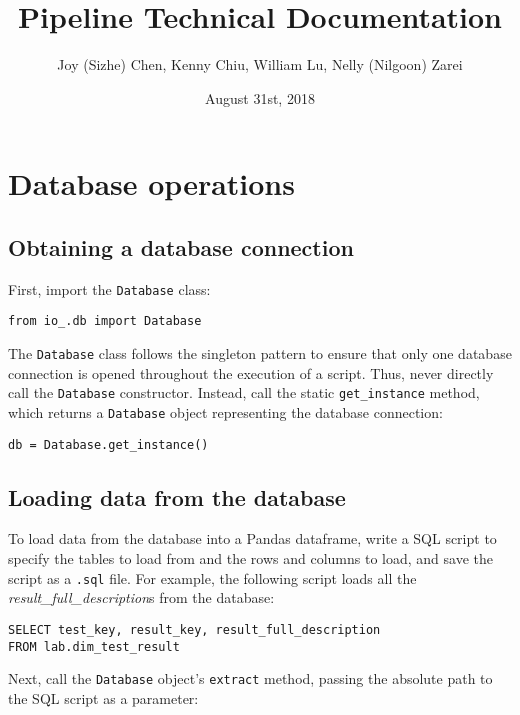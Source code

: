 \documentclass[a4paper]{article}
\title{Pipeline Technical Documentation}
\author{Joy (Sizhe) Chen, Kenny Chiu, William Lu, Nelly (Nilgoon) Zarei}
\date{August 31st, 2018}
\begin{document}
\maketitle

\section{Database operations}

\subsection{Obtaining a database connection}

First, import the \lstinline{Database} class:

\lstset{language=Python}
\begin{lstlisting}
from io_.db import Database
\end{lstlisting}
\lstset{language=}

The \lstinline{Database} class follows the singleton pattern to ensure that only one database connection is opened throughout the execution of a script. Thus, never directly call the \lstinline{Database} constructor. Instead, call the static \lstinline{get_instance} method, which returns a \lstinline{Database} object representing the database connection:

\lstset{language=Python}
\begin{lstlisting}
db = Database.get_instance()
\end{lstlisting}
\lstset{language=}

\subsection{Loading data from the database}

To load data from the database into a Pandas dataframe, write a SQL script to specify the tables to load from and the rows and columns to load, and save the script as a \lstinline{.sql} file. For example, the following script loads all the \textit{result\_full\_description}s from the database:

\lstset{language=SQL}
\begin{lstlisting}
SELECT test_key, result_key, result_full_description
FROM lab.dim_test_result
\end{lstlisting}
\lstset{language=}

Next, call the \lstinline{Database} object's \lstinline{extract} method, passing the absolute path to the SQL script as a parameter:
\end{document}
